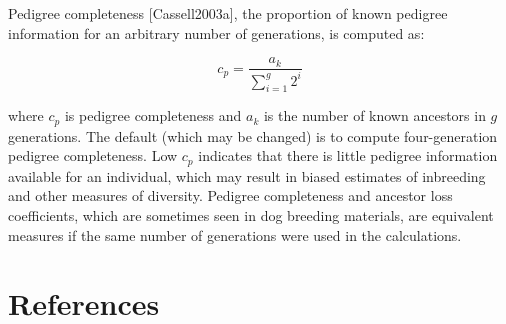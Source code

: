 \documentclass[
  letterpaper,
  DIV=11,
  numbers=noendperiod]{scrreprt}
\begin{document}
Pedigree completeness {[}Cassell2003a{]}, the proportion of known
pedigree information for an arbitrary number of generations, is computed
as:

\[ c_p = \dfrac{a_k}{\sum_{i=1}^g{2^i}} \]

where \(c_p\) is pedigree completeness and \(a_k\) is the number of
known ancestors in \(g\) generations. The default (which may be changed)
is to compute four-generation pedigree completeness. Low \(c_p\)
indicates that there is little pedigree information available for an
individual, which may result in biased estimates of inbreeding and other
measures of diversity. Pedigree completeness and ancestor loss
coefficients, which are sometimes seen in dog breeding materials, are
equivalent measures if the same number of generations were used in the
calculations.


\chapter*{References}\label{references}

\end{document}
